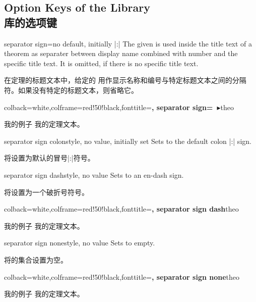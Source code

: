 \subsection{Option Keys of the Library\\库的选项键}


\begin{docTcbKey}{separator sign}{=}{no default, initially |:|}
The given  is used inside the title text of a theorem
as separater between display name combined with number and
the specific title text. It is omitted, if there is no specific title text.

在定理的标题文本中，给定的  用作显示名称和编号与特定标题文本之间的分隔符。如果没有特定的标题文本，则省略它。
\begin{dispExample}
%
  {colback=white,colframe=red!50!black,fonttitle=\bfseries,
   separator sign={\ $\blacktriangleright$}}{theo}
\begin{sometheorem}{我的例子}{}
我的定理文本。
\end{sometheorem}
\end{dispExample}
\end{docTcbKey}

\begin{docTcbKey}{separator sign colon}{}{style, no value, initially set}
Sets  to the default colon |:| sign.

将设置为默认的冒号|:|符号。
\end{docTcbKey}

\begin{docTcbKey}{separator sign dash}{}{style, no value}
Sets  to an en-dash sign.

将设置为一个破折号符号。
\begin{dispExample}
%
  {colback=white,colframe=red!50!black,fonttitle=\bfseries,
   separator sign dash}{theo}
\begin{sometheorem}{我的例子}{}
我的定理文本。
\end{sometheorem}
\end{dispExample}
\end{docTcbKey}

\begin{docTcbKey}{separator sign none}{}{style, no value}
Sets  to empty.

将的集合设置为空。
\begin{dispExample}
%
  {colback=white,colframe=red!50!black,fonttitle=\bfseries,
   separator sign none}{theo}
\begin{sometheorem}{我的例子}{}
我的定理文本。
\end{sometheorem}
\end{dispExample}
\end{docTcbKey}


